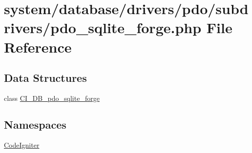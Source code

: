 \hypertarget{pdo__sqlite__forge_8php}{}\section{system/database/drivers/pdo/subdrivers/pdo\+\_\+sqlite\+\_\+forge.php File Reference}
\label{pdo__sqlite__forge_8php}
\subsection*{Data Structures}
\begin{DoxyCompactItemize}
\item 
class \mbox{\hyperlink{class_c_i___d_b__pdo__sqlite__forge}{C\+I\+\_\+\+D\+B\+\_\+pdo\+\_\+sqlite\+\_\+forge}}
\end{DoxyCompactItemize}
\subsection*{Namespaces}
\begin{DoxyCompactItemize}
\item 
 \mbox{\hyperlink{namespace_code_igniter}{Code\+Igniter}}
\end{DoxyCompactItemize}
